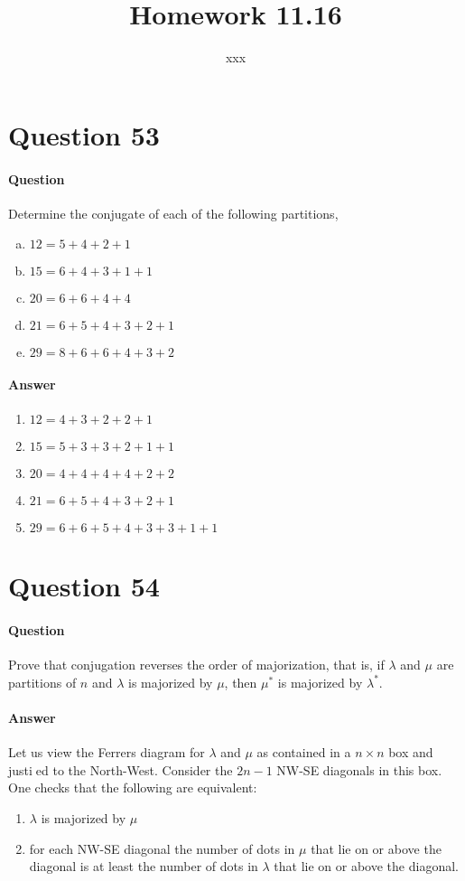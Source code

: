 \documentclass[UTF8]{article}
\title{Homework 11.16}
\author{xxx}
\date{}
\begin{document}
\maketitle
\section{Question 53}
\paragraph{Question}
Determine the conjugate of each of the following
partitions,
\begin{enumerate}[(a)]
    \item $ 12 = 5 + 4 + 2 + 1 $
    \item $ 15 = 6 + 4 + 3 + 1 + 1 $
    \item $ 20 = 6 + 6 + 4 + 4 $
    \item $ 21 = 6 + 5 + 4 + 3 + 2 + 1 $
    \item $ 29 = 8 + 6 + 6 + 4 + 3 + 2 $
\end{enumerate}
\paragraph{Answer}
    \begin{enumerate}
        \item $ 12 = 4 + 3 + 2 + 2 + 1 $
        \item $ 15 = 5 + 3 + 3 + 2 + 1 + 1 $
        \item $ 20 = 4 + 4 + 4 + 4 + 2 + 2 $
        \item $ 21 = 6 + 5 + 4 + 3 + 2 + 1 $
        \item $ 29 = 6 + 6 + 5 + 4 + 3 + 3 + 1 + 1 $
    \end{enumerate}


\section{Question 54}
\paragraph{Question}
Prove that conjugation reverses the order of majorization,
that is, if $ \lambda $ and $ \mu $ are partitions of $ n $ and $ \lambda $ is majorized by $ \mu $, then $ \mu^{*} $ is majorized
by $ \lambda^{*} $.
\paragraph{Answer}
Let us view the Ferrers diagram for $ \lambda $ and $ \mu $ as contained in a $ n \times n $ box and justied
to the North-West. Consider the $ 2n - 1 $ NW-SE diagonals in this box. One checks that the following are equivalent:
\begin{enumerate}[i]
    \item $ \lambda $ is majorized by $ \mu $
    \item for each NW-SE diagonal the number of dots in $ \mu $ that lie on or above the diagonal is
    at least the number of dots in $ \lambda $ that lie on or above the diagonal.
\end{enumerate}
\end{document}

